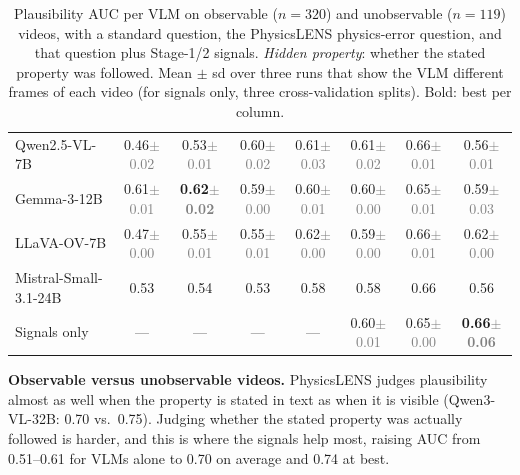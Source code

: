 \begin{table}[t]
\begin{tabular}{@{}lccccccc@{}}
        Qwen2.5-VL-7B & 0.46{\scriptsize\textcolor{gray}{$\pm$0.02}} & 0.53{\scriptsize\textcolor{gray}{$\pm$0.01}} & 0.60{\scriptsize\textcolor{gray}{$\pm$0.02}} & 0.61{\scriptsize\textcolor{gray}{$\pm$0.03}} & 0.61{\scriptsize\textcolor{gray}{$\pm$0.02}} & 0.66{\scriptsize\textcolor{gray}{$\pm$0.01}} & 0.56{\scriptsize\textcolor{gray}{$\pm$0.01}} \\
        Gemma-3-12B & 0.61{\scriptsize\textcolor{gray}{$\pm$0.01}} & \textbf{0.62{\scriptsize\textcolor{gray}{$\pm$0.02}}} & 0.59{\scriptsize\textcolor{gray}{$\pm$0.00}} & 0.60{\scriptsize\textcolor{gray}{$\pm$0.01}} & 0.60{\scriptsize\textcolor{gray}{$\pm$0.00}} & 0.65{\scriptsize\textcolor{gray}{$\pm$0.01}} & 0.59{\scriptsize\textcolor{gray}{$\pm$0.03}} \\
        LLaVA-OV-7B & 0.47{\scriptsize\textcolor{gray}{$\pm$0.00}} & 0.55{\scriptsize\textcolor{gray}{$\pm$0.01}} & 0.55{\scriptsize\textcolor{gray}{$\pm$0.01}} & 0.62{\scriptsize\textcolor{gray}{$\pm$0.00}} & 0.59{\scriptsize\textcolor{gray}{$\pm$0.00}} & 0.66{\scriptsize\textcolor{gray}{$\pm$0.01}} & 0.62{\scriptsize\textcolor{gray}{$\pm$0.00}} \\
        Mistral-Small-3.1-24B & 0.53 & 0.54 & 0.53 & 0.58 & 0.58 & 0.66 & 0.56 \\
        \midrule
        Signals only & --- & --- & --- & --- & 0.60{\scriptsize\textcolor{gray}{$\pm$0.01}} & 0.65{\scriptsize\textcolor{gray}{$\pm$0.00}} & \textbf{0.66{\scriptsize\textcolor{gray}{$\pm$0.06}}} \\
        \bottomrule
    \end{tabular}
    \caption{Plausibility AUC per VLM on observable ($n{=}320$) and unobservable ($n{=}119$) videos, with a standard question, the PhysicsLENS physics-error question, and that question plus Stage-1/2 signals. \emph{Hidden property}: whether the stated property was followed. Mean $\pm$ sd over three runs that show the VLM different frames of each video (for signals only, three cross-validation splits). Bold: best per column.}
    \label{tab:backbones-obs-unobs}
\end{table}

\textbf{Observable versus unobservable videos.} PhysicsLENS judges plausibility almost as well when the property is stated in text as when it is visible (Qwen3-VL-32B: 0.70 vs.\ 0.75). Judging whether the stated property was actually followed is harder, and this is where the signals help most, raising AUC from 0.51--0.61 for VLMs alone to 0.70 on average and 0.74 at best.

